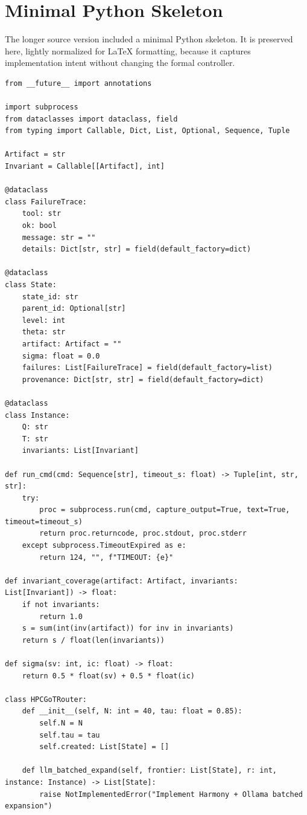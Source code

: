 \documentclass[11pt,a4paper]{article}
\numberwithin{equation}{section}
\theoremstyle{definition}
\begin{document}
\section{Minimal Python Skeleton}

The longer source version included a minimal Python skeleton. It is preserved here, lightly normalized for LaTeX formatting, because it captures implementation intent without changing the formal controller.

\begin{verbatim}
from __future__ import annotations

import subprocess
from dataclasses import dataclass, field
from typing import Callable, Dict, List, Optional, Sequence, Tuple

Artifact = str
Invariant = Callable[[Artifact], int]

@dataclass
class FailureTrace:
    tool: str
    ok: bool
    message: str = ""
    details: Dict[str, str] = field(default_factory=dict)

@dataclass
class State:
    state_id: str
    parent_id: Optional[str]
    level: int
    theta: str
    artifact: Artifact = ""
    sigma: float = 0.0
    failures: List[FailureTrace] = field(default_factory=list)
    provenance: Dict[str, str] = field(default_factory=dict)

@dataclass
class Instance:
    Q: str
    T: str
    invariants: List[Invariant]

def run_cmd(cmd: Sequence[str], timeout_s: float) -> Tuple[int, str, str]:
    try:
        proc = subprocess.run(cmd, capture_output=True, text=True, timeout=timeout_s)
        return proc.returncode, proc.stdout, proc.stderr
    except subprocess.TimeoutExpired as e:
        return 124, "", f"TIMEOUT: {e}"

def invariant_coverage(artifact: Artifact, invariants: List[Invariant]) -> float:
    if not invariants:
        return 1.0
    s = sum(int(inv(artifact)) for inv in invariants)
    return s / float(len(invariants))

def sigma(sv: int, ic: float) -> float:
    return 0.5 * float(sv) + 0.5 * float(ic)

class HPCGoTRouter:
    def __init__(self, N: int = 40, tau: float = 0.85):
        self.N = N
        self.tau = tau
        self.created: List[State] = []

    def llm_batched_expand(self, frontier: List[State], r: int, instance: Instance) -> List[State]:
        raise NotImplementedError("Implement Harmony + Ollama batched expansion")


\end{verbatim}
\end{document}
